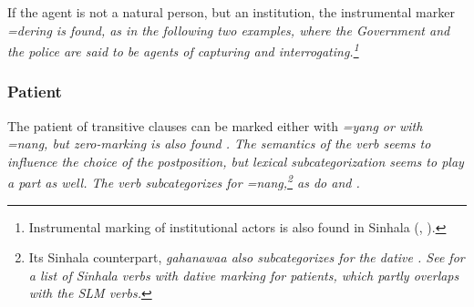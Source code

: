 
If the agent is not a natural person, but an institution, the instrumental marker \em =dering \em is found, as in the following two examples, where the Government and the police are said to be agents of capturing and interrogating.\footnote{Instrumental marking of institutional actors is also found in Sinhala (\citet[31]{GairEtAl1997}, \citet[791]{Gair2003}).}





\subsubsection{Patient}\label{sec:func:Patient}
The patient of transitive clauses can be marked either with \em =yang \em or with \em =nang\em, but zero-marking is also found \citep{Ansaldo2008genesis}. The  semantics of the verb seems to influence the choice of the postposition, but lexical subcategorization seems to play a part as well. The verb   subcategorizes for \em =nang\em,\footnote{Its
 Sinhala counterpart, \em gahanawaa \em also subcategorizes for the dative \citep[18f]{Gair1991infl}. See \citet[36,92]{Garusinghe1962} for a list of Sinhala verbs with dative marking for patients, which partly overlaps with the SLM verbs.}
 as do    and  .

